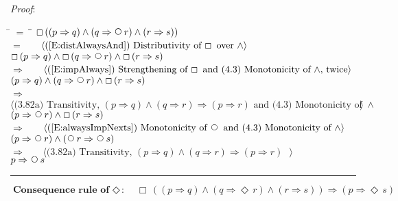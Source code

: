 \documentclass[12pt, fleqn, leqno]{article}
\newcommand{\lgap}{2pt}                             %
\newcommand{\mymathindent}{24pt}                    %
\newcommand{\impl}{\ensuremath{\Rightarrow}}        %
\newcommand{\Next}{\;\,\text{\raisebox{3.5pt}{\circle{6}}}}
\newcommand{\Event}{\Diamond\,}
\newcommand{\Always}{\Box\,}
\newcommand{\myqed}{\rule[-.23ex]{1.2ex}{2.0ex}}
\newcommand{\myqedtab}{\hspace{384pt}}              %
\newcommand{\Gll} {\langle}                         %
\newcommand{\Ggg} {\rangle}                         %
\newcommand{\Hint}[1]     {\ \ \ $\Gll              \mbox{#1} \Ggg$ }   %
\begin{document}
\emph{Proof}:
\begin{tabbing}
\hspace{\mymathindent} \= $= \;$ \= \myqedtab \= \kill
  \> \>   $\Always ( (p \impl q) \land (q \impl \Next r) \land (r \impl s))$\\[\lgap]
   \> $=$  \>  \Hint{(\ref{E:distAlwaysAnd}) Distributivity of $\Always$ over $\land$}\\[\lgap]
  \> \>   $\Always ( p \impl q) \land \Always (q \impl \Next r) \land \Always (r \impl s)$\\[\lgap]
   \> $\impl$  \>  \Hint{(\ref{E:impAlways}) Strengthening of $\Always$ and (4.3) Monotonicity of $\land$, twice}\\[\lgap]
    \> \>   $ (p \impl q) \land (q \impl \Next r) \land \Always (r \impl s)$\\[\lgap]
    \> $\impl$  \>  \Hint{(3.82a) Transitivity, $(p\impl q) \land (q\impl r) \impl (p\impl r)$ and (4.3) Monotonicity of $\land$}\\[\lgap]
     \> \>   $ (p \impl \Next r) \land \Always (r \impl s)$\\[\lgap]
     \> $\impl$ \> \Hint{(\ref{E:alwaysImpNexts}) Monotonicity of $\Next$ and (4.3) Monotonicity of $\land$} \\[\lgap]
  \> \>   $ (p \impl \Next r) \land (\Next r \impl \Next s)$\\[\lgap]
  \> $\impl$  \>  \Hint{(3.82a) Transitivity, $(p\impl q) \land (q\impl r) \impl (p\impl r)$ }\\[\lgap]
  \> \>   $ p \impl \Next s$\quad \myqed
\end{tabbing}
\begin{equation}\label{E:EventConRule}
\textbf{Consequence rule of $\Event$:}\quad \Always ( (p \impl q) \land (q \impl \Event r) \land (r \impl s)) \impl (p \impl \Event s)
\end{equation}
\end{document}
